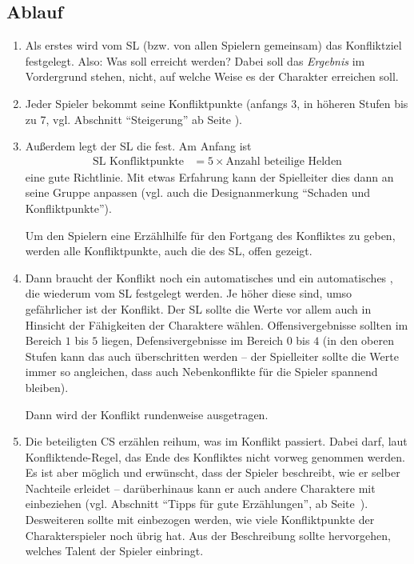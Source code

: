 \subsection{Ablauf}
\begin{enumerate}
  \item Als erstes wird vom SL (bzw. von allen Spielern gemeinsam) das Konfliktziel festgelegt. Also: Was soll erreicht werden? Dabei soll das \emph{Ergebnis} im Vordergrund stehen, nicht, auf welche Weise es der Charakter erreichen soll.

  \item {Jeder Spieler bekommt seine Konfliktpunkte (anfangs 3, in höheren Stufen bis zu 7, vgl. Abschnitt ``Steigerung'' ab Seite \pageref{Steigerung}).}
  
  \item Außerdem legt der SL die  fest. Am Anfang ist
  \begin{align*}
    \text{SL Konfliktpunkte} &= 5 \times \text{Anzahl beteilige Helden}
  \end{align*}
  eine gute Richtlinie. Mit etwas Erfahrung kann der Spielleiter dies dann an seine Gruppe anpassen (vgl. auch die Designanmerkung ``Schaden und Konfliktpunkte'').

  Um den Spielern eine Erzählhilfe für den Fortgang des Konfliktes zu geben, werden alle Konfliktpunkte, auch die des SL, offen gezeigt.

  \item Dann braucht der Konflikt noch ein automatisches  und ein automatisches , die wiederum vom SL festgelegt werden. Je höher diese sind, umso gefährlicher ist der Konflikt. Der SL sollte die Werte vor allem auch in Hinsicht der Fähigkeiten der Charaktere wählen. {Offensivergebnisse sollten im Bereich $1$ bis $5$ liegen, Defensivergebnisse im Bereich $0$ bis $4$ (in den oberen Stufen kann das auch überschritten werden -- der Spielleiter sollte die Werte immer so angleichen, dass auch Nebenkonflikte für die Spieler spannend bleiben).}

  Dann wird der Konflikt rundenweise ausgetragen.

  \item\label{NKNaechsteRunde} Die beteiligten CS erzählen reihum, was im Konflikt passiert. Dabei darf, laut Konfliktende-Regel, das Ende des Konfliktes nicht vorweg genommen werden. Es ist aber möglich und erwünscht, dass der Spieler beschreibt, wie er selber Nachteile erleidet -- darüberhinaus kann er auch andere Charaktere mit einbeziehen {(vgl. Abschnitt ``Tipps für gute Erzählungen'', ab Seite~\pageref{TippsGuteErz})}. Desweiteren sollte mit einbezogen werden, wie viele Konfliktpunkte der Charakterspieler noch übrig hat. {Aus der Beschreibung sollte hervorgehen, welches Talent der Spieler einbringt.}


\end{enumerate}
